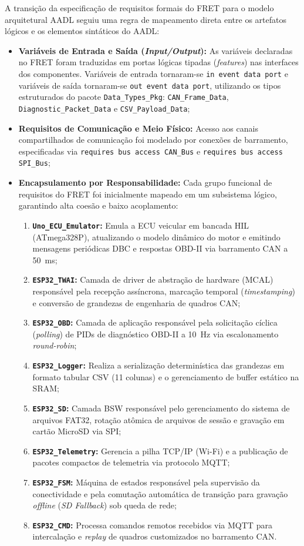 A transição da especificação de requisitos formais do FRET para o modelo arquitetural AADL seguiu uma regra de mapeamento direta entre os artefatos lógicos e os elementos sintáticos do AADL:
\begin{itemize}
    \item \textbf{Variáveis de Entrada e Saída (\textit{Input/Output}):} As variáveis declaradas no FRET foram traduzidas em portas lógicas tipadas (\textit{features}) nas interfaces dos componentes. Variáveis de entrada tornaram-se \texttt{in event data port} e variáveis de saída tornaram-se \texttt{out event data port}, utilizando os tipos estruturados do pacote \texttt{Data\_Types\_Pkg}: \texttt{CAN\_Frame\_Data}, \texttt{Diagnostic\_Packet\_Data} e \texttt{CSV\_Payload\_Data};
    \item \textbf{Requisitos de Comunicação e Meio Físico:} Acesso aos canais compartilhados de comunicação foi modelado por conexões de barramento, especificadas via \texttt{requires bus access CAN\_Bus} e \texttt{requires bus access SPI\_Bus};
    \item \textbf{Encapsulamento por Responsabilidade:} Cada grupo funcional de requisitos do FRET foi inicialmente mapeado em um subsistema lógico, garantindo alta coesão e baixo acoplamento:
    \begin{enumerate}
        \item \textbf{\texttt{Uno\_ECU\_Emulator}:} Emula a ECU veicular em bancada HIL (ATmega328P), atualizando o modelo dinâmico do motor e emitindo mensagens periódicas DBC e respostas OBD-II via barramento CAN a 50~ms;
        \item \textbf{\texttt{ESP32\_TWAI}:} Camada de driver de abstração de hardware (MCAL) responsável pela recepção assíncrona, marcação temporal (\textit{timestamping}) e conversão de grandezas de engenharia de quadros CAN;
        \item \textbf{\texttt{ESP32\_OBD}:} Camada de aplicação responsável pela solicitação cíclica (\textit{polling}) de PIDs de diagnóstico OBD-II a 10~Hz via escalonamento \textit{round-robin};
        \item \textbf{\texttt{ESP32\_Logger}:} Realiza a serialização determinística das grandezas em formato tabular CSV (11 colunas) e o gerenciamento de buffer estático na SRAM;
        \item \textbf{\texttt{ESP32\_SD}:} Camada BSW responsável pelo gerenciamento do sistema de arquivos FAT32, rotação atômica de arquivos de sessão e gravação em cartão MicroSD via SPI;
        \item \textbf{\texttt{ESP32\_Telemetry}:} Gerencia a pilha TCP/IP (Wi-Fi) e a publicação de pacotes compactos de telemetria via protocolo MQTT;
        \item \textbf{\texttt{ESP32\_FSM}:} Máquina de estados responsável pela supervisão da conectividade e pela comutação automática de transição para gravação \textit{offline} (\textit{SD Fallback}) sob queda de rede;
        \item \textbf{\texttt{ESP32\_CMD}:} Processa comandos remotos recebidos via MQTT para intercalação e \textit{replay} de quadros customizados no barramento CAN.
    \end{enumerate}
\end{itemize}


